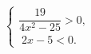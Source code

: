 \begin{ex}[type=ineq_system]
	\begin{condition}
		$\begin{cases}\dfrac{19}{4x^2 - 25} >0  ,\\
			\; 2x - 5<0  .
		\end{cases}$
	\end{condition}
\end{ex}